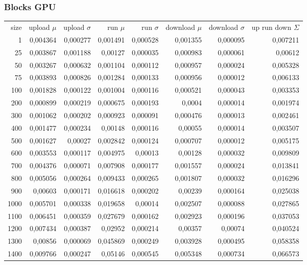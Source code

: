 \subsubsection{Blocks GPU}

\begin{tabular}{r r r r r r r r}
size & upload $\mu$  & upload $\sigma$ & run $\mu$ & run $\sigma$ & download $\mu$ & download $\sigma$ & up run down $\Sigma$ \\
1 & 0,004364 & 0,000277 & 0,001491 & 0,000528 & 0,001355 & 0,000095 & 0,007211 \\
25 & 0,003867 & 0,001188 & 0,00127 & 0,000035 & 0,000983 & 0,000061 & 0,00612 \\
50 & 0,003267 & 0,000632 & 0,001104 & 0,000112 & 0,000957 & 0,000024 & 0,005328 \\
75 & 0,003893 & 0,000826 & 0,001284 & 0,000133 & 0,000956 & 0,000012 & 0,006133 \\
100 & 0,001828 & 0,000122 & 0,001004 & 0,000116 & 0,000521 & 0,000043 & 0,003353 \\
200 & 0,000899 & 0,000219 & 0,000675 & 0,000193 & 0,0004 & 0,000014 & 0,001974 \\
300 & 0,001062 & 0,000202 & 0,000923 & 0,000091 & 0,000476 & 0,000013 & 0,002461 \\
400 & 0,001477 & 0,000234 & 0,00148 & 0,000116 & 0,00055 & 0,000014 & 0,003507 \\
500 & 0,001627 & 0,00027 & 0,002842 & 0,000124 & 0,000707 & 0,000012 & 0,005175 \\
600 & 0,003553 & 0,000117 & 0,004975 & 0,00013 & 0,00128 & 0,000032 & 0,009809 \\
700 & 0,004376 & 0,000071 & 0,007908 & 0,000177 & 0,001557 & 0,000024 & 0,013841 \\
800 & 0,005056 & 0,000264 & 0,009433 & 0,000265 & 0,001807 & 0,000032 & 0,016296 \\
900 & 0,00603 & 0,000171 & 0,016618 & 0,000202 & 0,00239 & 0,000164 & 0,025038 \\
1000 & 0,005701 & 0,000338 & 0,019658 & 0,00014 & 0,002507 & 0,000088 & 0,027865 \\
1100 & 0,006451 & 0,000359 & 0,027679 & 0,000162 & 0,002923 & 0,000196 & 0,037053 \\
1200 & 0,007434 & 0,000387 & 0,02952 & 0,000214 & 0,00357 & 0,00074 & 0,040524 \\
1300 & 0,00856 & 0,000069 & 0,045869 & 0,000249 & 0,003928 & 0,000495 & 0,058358 \\
1400 & 0,009766 & 0,000247 & 0,05146 & 0,000545 & 0,005348 & 0,000734 & 0,066573 \\

\end{tabular}

